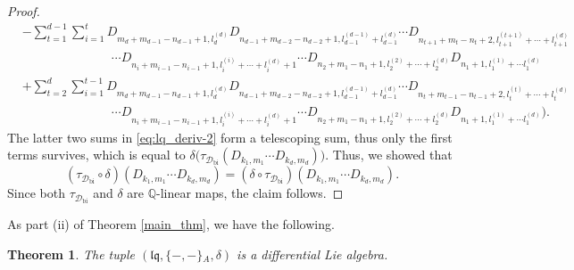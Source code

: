 \documentclass[12pt,reqno]{amsart}
\newtheorem{thm}{Theorem}[section]
\numberwithin{equation}{section}
\theoremstyle{definition}
\newcommand{\QQ}{\mathbb{Q}}
\newcommand{\Dbi}{\mathcal{D}_{\operatorname{bi}}}
\newcommand{\lqq}{\mathfrak{lq}}
\newcommand{\ariemp}{\{-,-\}\!_A}
\begin{document}
\begin{proof}
\begin{align}
&-\sum_{t=1}^{d-1}\sum_{i=1}^t D_{m_d+m_{d-1}-n_{d-1}+1,l_d^{(d)}}D_{n_{d-1}+m_{d-2}-n_{d-2}+1,l_{d-1}^{(d-1)}+l_{d-1}^{(d)}}\cdots D_{n_{t+1}+m_t-n_t+2,l_{t+1}^{(t+1)}+\cdots+l_{t+1}^{(d)}} \nonumber \\
&\hspace{3cm} \cdots D_{n_i+m_{i-1}-n_{i-1}+1,l_i^{(i)}+\cdots+l_i^{(d)}+1}\cdots D_{n_2+m_1-n_1+1,l_2^{(2)}+\cdots+l_2^{(d)}}D_{n_1+1,l_1^{(1)}+\cdots l_1^{(d)}} \nonumber \\
&+\sum_{t=2}^d\sum_{i=1}^{t-1} D_{m_d+m_{d-1}-n_{d-1}+1,l_d^{(d)}}D_{n_{d-1}+m_{d-2}-n_{d-2}+1,l_{d-1}^{(d-1)}+l_{d-1}^{(d)}}\cdots D_{n_t+m_{t-1}-n_{t-1}+2,l_t^{(t)}+\cdots+l_t^{(d)}} \nonumber \\
&\hspace{3cm} \cdots D_{n_i+m_{i-1}-n_{i-1}+1,l_i^{(i)}+\cdots+l_i^{(d)}+1}\cdots D_{n_2+m_1-n_1+1,l_2^{(2)}+\cdots+l_2^{(d)}}D_{n_1+1,l_1^{(1)}+\cdots l_1^{(d)}}\Bigg). \nonumber
\end{align}
The latter two sums in \eqref{eq:lq_deriv-2} form a telescoping sum, thus only the first terms survives, which is equal to
$\delta\big(\tau_{\Dbi}(D_{k_1,m_1}\cdots D_{k_d,m_d})\big)$. Thus, we showed that
\[(\tau_{\Dbi}\circ \delta)(D_{k_1,m_1}\cdots D_{k_d,m_d}) =(\delta\circ\tau_{\Dbi})(D_{k_1,m_1}\cdots D_{k_d,m_d}).\]
Since both $\tau_{\Dbi}$ and $\delta$ are $\QQ$-linear maps, the claim follows.
\end{proof}

As part (ii) of Theorem \ref{main_thm}, we have the following.

\begin{thm} \label{thm:lq_deriv} The tuple $(\lqq,\ariemp,\delta)$ is a differential Lie algebra.
\end{thm}
\end{document}
